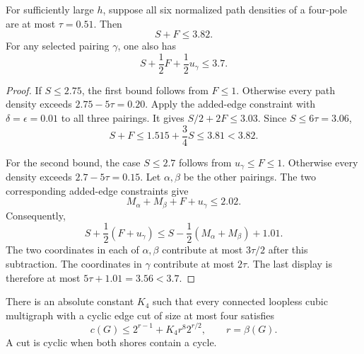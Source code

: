 \begin{lemma}\label{lem:four-pole-low-state}
For sufficiently large $h$, suppose all six normalized path densities
of a four-pole are at most $\tau=0.51$.
Then
\[
 S+F\le3.82.
\]
For any selected pairing $\gamma$, one also has
\[
 S+\frac12F+\frac12u_\gamma\le3.7.
\]
\end{lemma}

\begin{proof}
If $S\le2.75$, the first bound follows from $F\le1$.
Otherwise every path density exceeds $2.75-5\tau=0.20$.
Apply the added-edge constraint with $\delta=\epsilon=0.01$ to all three pairings.
It gives $S/2+2F\le3.03$.
Since $S\le6\tau=3.06$,
\[
 S+F\le1.515+\frac34S\le3.81<3.82.
\]

For the second bound, the case $S\le2.7$ follows from $u_\gamma\le F\le1$.
Otherwise every density exceeds $2.7-5\tau=0.15$.
Let $\alpha,\beta$ be the other pairings.
The two corresponding added-edge constraints give
\[
 M_\alpha+M_\beta+F+u_\gamma\le2.02.
\]
Consequently,
\[
 S+\frac12(F+u_\gamma)
 \le S-\frac12(M_\alpha+M_\beta)+1.01.
\]
The two coordinates in each of $\alpha,\beta$ contribute at most
$3\tau/2$ after this subtraction.
The coordinates in $\gamma$ contribute at most $2\tau$.
The last display is therefore at most $5\tau+1.01=3.56<3.7$.
\end{proof}

\begin{theorem}
\label{thm:all-four-cut-half-exponent}
There is an absolute constant $K_4$ such that every connected loopless
cubic multigraph with a cyclic edge cut of size at most four satisfies
\[
 c(G)\le2^{r-1}+K_4r^8 2^{r/2},\qquad r=\beta(G).
\]
A cut is cyclic when both shores contain a cycle.
\end{theorem}

